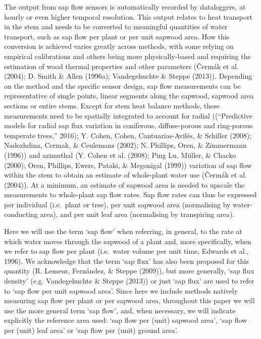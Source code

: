 \documentclass[11pt,twoside]{reedthesis}
\begin{document}
The output from sap flow sensors is automatically recorded by
dataloggers, at hourly or even higher temporal resolution. This output
relates to heat transport in the stem and needs to be converted to
meaningful quantities of water transport, such as sap flow per plant or
per unit sapwood area. How this conversion is achieved varies greatly
across methods, with some relying on empirical calibrations and others
being more physically-based and requiring the estimation of wood thermal
properties and other parameters (Čermák et al. (2004); D. Smith \& Allen
(1996a); Vandegehuchte \& Steppe (2013)). Depending on the method and
the specific sensor design, sap flow measurements can be representative
of single points, linear segments along the sapwood, sapwood area
sections or entire stems. Except for stem heat balance methods, these
measurements need to be spatially integrated to account for radial
((``Predictive models for radial sap flux variation in coniferous,
diffuse-porous and ring-porous temperate trees,'' 2016); Y. Cohen,
Cohen, Cantuarias-Avilés, \& Schiller (2008); Nadezhdina, Cermak, \&
Ceulemans (2002); N. Phillips, Oren, \& Zimmermann (1996)) and azimuthal
(Y. Cohen et al. (2008); Ping Lu, Müller, \& Chacko (2000); Oren,
Phillips, Ewers, Pataki, \& Megonigal (1999)) variation of sap flow
within the stem to obtain an estimate of whole-plant water use (Čermák
et al. (2004)). At a minimum, an estimate of sapwood area is needed to
upscale the measurements to whole-plant sap flow rates. Sap flow rates
can thus be expressed per individual (i.e.~plant or tree), per unit
sapwood area (normalising by water-conducting area), and per unit leaf
area (normalising by transpiring area).\par

Here we will use the term `sap flow' when referring, in general, to the
rate at which water moves through the sapwood of a plant and, more
specifically, when we refer to sap flow per plant (i.e.~water volume per
unit time, Edwards et al., 1996). We acknowledge that the term `sap
flux' has also been proposed for this quantity (R. Lemeur, Fernández, \&
Steppe (2009)), but more generally, `sap flux density' (e.g.
Vandegehuchte \& Steppe (2013)) or just `sap flux' are used to refer to
`sap flow per unit sapwood area'. Since here we include methods natively
measuring sap flow per plant or per sapwood area, throughout this paper
we will use the more general term `sap flow', and, when necessary, we
will indicate explicitly the reference area used: `sap flow per (unit)
sapwood area', `sap flow per (unit) leaf area' or `sap flow per (unit)
ground area'.\par 
\end{document}
